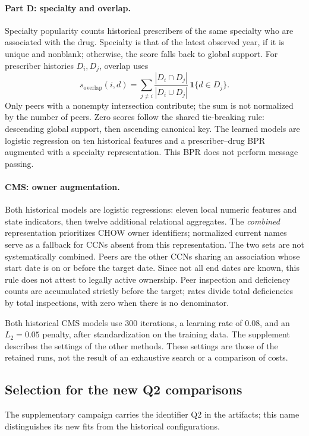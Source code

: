 \paragraph{Part D: specialty and overlap.} Specialty popularity counts historical prescribers of the same specialty who are associated with the drug. Specialty is that of the latest observed year, if it is unique and nonblank; otherwise, the score falls back to global support. For prescriber histories $D_i,D_j$, overlap uses
\begin{equation}
 s_{\mathrm{overlap}}(i,d)=\sum_{j\ne i}\frac{|D_i\cap D_j|}{|D_i\cup D_j|}\,\mathbf{1}\{d\in D_j\}.
\end{equation}
Only peers with a nonempty intersection contribute; the sum is not normalized by the number of peers. Zero scores follow the shared tie-breaking rule: descending global support, then ascending canonical key. The learned models are logistic regression on ten historical features and a prescriber--drug BPR augmented with a specialty representation. This BPR does not perform message passing\cite{hgbcode,hgbpartd}.

\paragraph{CMS: owner augmentation.} Both historical models are logistic regressions: eleven local numeric features and state indicators, then twelve additional relational aggregates. The \emph{combined} representation prioritizes CHOW owner identifiers; normalized current names serve as a fallback for CCNs absent from this representation. The two sets are not systematically combined. Peers are the other CCNs sharing an association whose start date is on or before the target date. Since not all end dates are known, this rule does not attest to legally active ownership. Peer inspection and deficiency counts are accumulated strictly before the target; rates divide total deficiencies by total inspections, with zero when there is no denominator\cite{hgbcode}.

Both historical CMS models use 300 iterations, a learning rate of 0.08, and an $L_2=0.05$ penalty, after standardization on the training data. The supplement describes the settings of the other methods. These settings are those of the retained runs, not the result of an exhaustive search or a comparison of costs.

\subsection{Selection for the new Q2 comparisons}
\label{sec:q2-methods}
The supplementary campaign carries the identifier Q2 in the artifacts; this name distinguishes its new fits from the historical configurations.

